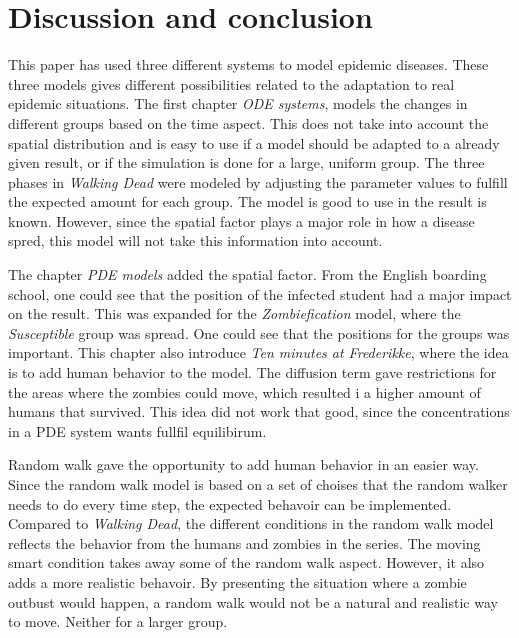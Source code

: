 \documentclass[%
twoside,                 %
final,                   %
chapterprefix=true,      %
open=right               %
10pt]{book}
\begin{document}
\chapter{Discussion and conclusion}
This paper has used three different systems to model epidemic diseases. These three models gives different possibilities related to the adaptation to real epidemic situations. The first chapter \emph{ODE systems}, models the changes in different groups based on the time aspect. This does not take into account the spatial distribution and is easy to use if a model should be adapted to a already given result, or if the simulation is done for a large, uniform group. The three phases in \emph{Walking Dead} were modeled by adjusting the parameter values to fulfill the expected amount for each group. The model is good to use in the result is known. However, since the spatial factor plays a major role in how a disease spred, this model will not take this information into account. 


\vspace{3mm}




\vspace{3mm}


The chapter \emph{PDE models} added the spatial factor. From the English boarding school, one could see that the position of the infected student had a major impact on the result. This was expanded for the \emph{Zombiefication} model, where the \emph{Susceptible} group was spread. One could see that the positions for the groups was important. This chapter also introduce \emph{Ten minutes at Frederikke}, where the idea is to add human behavior to the model. The diffusion term gave restrictions for the areas where the zombies could move, which resulted i a higher amount of humans that survived. This idea did not work that good, since the concentrations in a PDE system wants fullfil equilibirum. 


\vspace{3mm}




\vspace{3mm}


Random walk gave the opportunity to add human behavior in an easier way. Since the random walk model is based on a set of choises that the random walker needs to do every time step, the expected behavoir can be implemented. Compared to \emph{Walking Dead}, the different conditions in the random walk model reflects the behavior from the humans and zombies in the series. The moving smart condition takes away some of the random walk aspect. However, it also adds a more realistic behavoir. By presenting the situation where a zombie outbust would happen, a random walk would not be a natural and realistic way to move. Neither for a larger group. 
\end{document}
